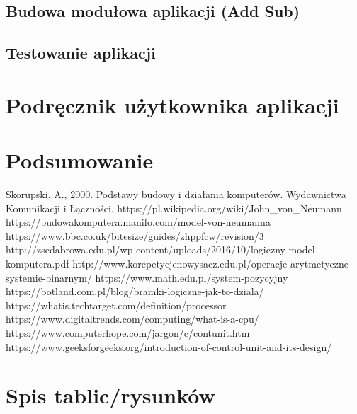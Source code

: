 \documentclass[12pt, a4paper, onside, polish]{article}				%
\begin{document}
\subsection{Budowa modułowa aplikacji (Add Sub)}
\cleardoublepage

\subsection{Testowanie aplikacji}
\cleardoublepage



\section{Podręcznik użytkownika aplikacji}
\cleardoublepage




\section{Podsumowanie}
\cleardoublepage



\begin{thebibliography}{100}
 Skorupski, A., 2000. Podstawy budowy i działania komputerów. Wydawnictwa Komunikacji i Łączności.
\bibitem{} https://pl.wikipedia.org/wiki/John_von_Neumann 
\bibitem{} https://budowakomputera.manifo.com/model-von-neumanna 
\bibitem{} https://www.bbc.co.uk/bitesize/guides/zhppfcw/revision/3 
\bibitem{} http://zsedabrowa.edu.pl/wp-content/uploads/2016/10/logiczny-model-komputera.pdf 
\bibitem{} http://www.korepetycjenowysacz.edu.pl/operacje-arytmetyczne-systemie-binarnym/
\bibitem{} https://www.math.edu.pl/system-pozycyjny
\bibitem{} https://botland.com.pl/blog/bramki-logiczne-jak-to-dziala/
\bibitem{} https://whatis.techtarget.com/definition/processor
\bibitem{} https://www.digitaltrends.com/computing/what-is-a-cpu/
\bibitem{} https://www.computerhope.com/jargon/c/contunit.htm
\bibitem{} https://www.geeksforgeeks.org/introduction-of-control-unit-and-its-design/

\end{thebibliography}


\cleardoublepage
\section{Spis tablic/rysunków}
\begin{appendix}
\listoftables
\listoffigures
\end{appendix}

\cleardoublepage
\end{document}
